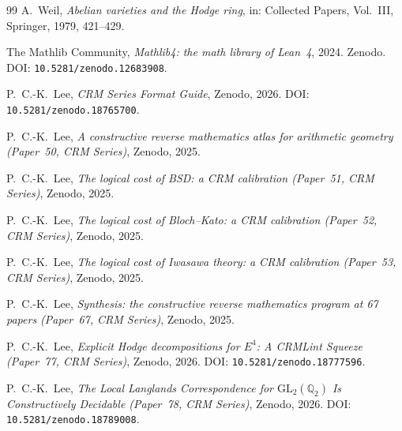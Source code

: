 \documentclass[11pt]{article}
\theoremstyle{plain}
\theoremstyle{definition}
\theoremstyle{remark}
\newcommand{\Q}{\mathbb{Q}}
\newcommand{\GL}{\mathrm{GL}}
\begin{document}
\begin{thebibliography}{99}
A.~Weil,
\emph{Abelian varieties and the Hodge ring},
in: Collected Papers, Vol.~III, Springer, 1979, 421--429.

The Mathlib Community,
\emph{Mathlib4: the math library of Lean~4}, 2024.
Zenodo.
DOI: \texttt{10.5281/zenodo.12683908}.

P.~C.-K.~Lee,
\emph{CRM Series Format Guide},
Zenodo, 2026.
DOI: \texttt{10.5281/zenodo.18765700}.

P.~C.-K.~Lee,
\emph{A constructive reverse mathematics atlas for arithmetic geometry
(Paper~50, CRM Series)},
Zenodo, 2025.

P.~C.-K.~Lee,
\emph{The logical cost of BSD: a CRM calibration
(Paper~51, CRM Series)},
Zenodo, 2025.

P.~C.-K.~Lee,
\emph{The logical cost of Bloch--Kato: a CRM calibration
(Paper~52, CRM Series)},
Zenodo, 2025.

P.~C.-K.~Lee,
\emph{The logical cost of Iwasawa theory: a CRM calibration
(Paper~53, CRM Series)},
Zenodo, 2025.

P.~C.-K.~Lee,
\emph{Synthesis: the constructive reverse mathematics program at 67 papers
(Paper~67, CRM Series)},
Zenodo, 2025.

P.~C.-K.~Lee,
\emph{Explicit Hodge decompositions for $E^4$:
A CRMLint Squeeze (Paper~77, CRM Series)},
Zenodo, 2026.
DOI: \texttt{10.5281/zenodo.18777596}.

P.~C.-K.~Lee,
\emph{The Local Langlands Correspondence for $\GL_2(\Q_2)$
Is Constructively Decidable (Paper~78, CRM Series)},
Zenodo, 2026.
DOI: \texttt{10.5281/zenodo.18789008}.

\end{thebibliography}
\end{document}

